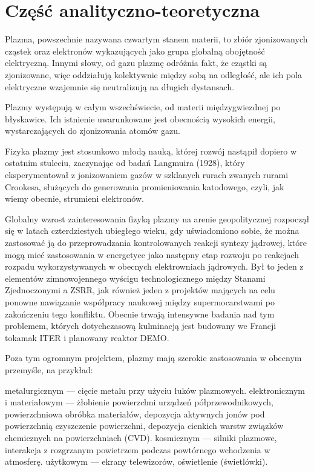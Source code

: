 \section[Część analityczno-teoretyczna]{Część analityczno-teoretyczna}\label{sec:theory} %
    Plazma, powszechnie nazywana czwartym stanem materii, to zbiór
    zjonizowanych cząstek oraz elektronów wykazujących jako grupa globalną
    obojętność elektryczną. Innymi słowy, od gazu plazmę odróżnia fakt, że
    cząstki są zjonizowane, więc oddziałują kolektywnie między sobą na
    odległość, ale ich pola elektryczne wzajemnie się neutralizują na długich
    dystansach.

    Plazmy występują w całym wszechświecie, od materii międzygwiezdnej po
    błyskawice.  Ich istnienie uwarunkowane jest obecnością wysokich energii,
    wystarczających do zjonizowania atomów gazu.

    Fizyka plazmy jest stosunkowo młodą nauką, której rozwój nastąpił dopiero w
    ostatnim stuleciu, zaczynając od badań Langmuira (1928), który
    eksperymentował z jonizowaniem gazów w szklanych rurach zwanych rurami
    Crookesa, służących do generowania promieniowania katodowego, czyli, jak
    wiemy obecnie, strumieni elektronów.\cite{bellan}

    Globalny wzrost zainteresowania fizyką plazmy na arenie geopolitycznej
    rozpoczął się w latach czterdziestych ubiegłego wieku, gdy uświadomiono sobie,
    że można zastosować ją do przeprowadzania kontrolowanych reakcji syntezy
    jądrowej,
    które mogą mieć zastosowania w energetyce jako następny etap rozwoju po
    reakcjach rozpadu wykorzystywanych w obecnych elektrowniach jądrowych.
    Był to jeden z elementów zimnowojennego wyścigu technologicznego między Stanami
    Zjednoczonymi a ZSRR, jak również jeden z projektów mających na celu ponowne
    nawiązanie współpracy naukowej między supermocarstwami po zakończeniu tego
    konfliktu. Obecnie trwają intensywne badania nad tym problemem, których
    dotychczasową kulminacją jest budowany we Francji tokamak ITER i planowany reaktor DEMO\@.

    Poza tym ogromnym projektem, plazmy mają szerokie zastosowania w obecnym
    przemyśle, na przykład:
    \begin{itemize}
        \itemi{} metalurgicznym --- cięcie metalu przy użyciu łuków plazmowych.
        \itemi{} elektronicznym i materiałowym --- żłobienie powierzchni urządzeń
            półprzewodnikowych, powierzchniowa obróbka materiałów, depozycja
            aktywnych jonów pod powierzchnią czyszczenie powierzchni, depozycja
            cienkich warstw związków chemicznych na powierzchniach (CVD).
        \itemi{} kosmicznym --- silniki plazmowe, interakcja z rozgrzanym powietrzem
            podczas powtórnego wchodzenia w atmosferę.
        \itemi{} użytkowym --- ekrany telewizorów, oświetlenie (świetlówki).
    \end{itemize}

